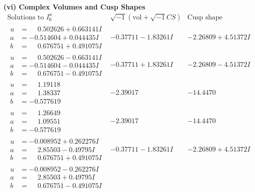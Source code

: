 \documentclass[1p]{elsarticle_modified}
\theoremstyle{definition}
\newcommand{\I}{\sqrt{-1}}
\begin{document}
\newpage\flushleft \textbf{(vi) Complex Volumes and Cusp Shapes}
$$\begin{array}{c|c|c}  
\text{Solutions to }I^u_{6}& \I (\text{vol} + \sqrt{-1}CS) & \text{Cusp shape}\\
 \hline 
\begin{aligned}
u &= \phantom{-}0.502626 + 0.663141 I \\
a &= -0.514604 + 0.044435 I \\
b &= \phantom{-}0.676751 + 0.491075 I\end{aligned}
 & -0.37711 - 1.83261 I & -2.26809 + 4.51372 I \\ \hline\begin{aligned}
u &= \phantom{-}0.502626 - 0.663141 I \\
a &= -0.514604 - 0.044435 I \\
b &= \phantom{-}0.676751 - 0.491075 I\end{aligned}
 & -0.37711 + 1.83261 I & -2.26809 - 4.51372 I \\ \hline\begin{aligned}
u &= \phantom{-}1.19118\phantom{ +0.000000I} \\
a &= \phantom{-}1.38337\phantom{ +0.000000I} \\
b &= -0.577619\phantom{ +0.000000I}\end{aligned}
 & -2.39017\phantom{ +0.000000I} & -14.4470\phantom{ +0.000000I} \\ \hline\begin{aligned}
u &= \phantom{-}1.26649\phantom{ +0.000000I} \\
a &= \phantom{-}1.09551\phantom{ +0.000000I} \\
b &= -0.577619\phantom{ +0.000000I}\end{aligned}
 & -2.39017\phantom{ +0.000000I} & -14.4470\phantom{ +0.000000I} \\ \hline\begin{aligned}
u &= -0.008952 + 0.262276 I \\
a &= \phantom{-}2.85503 - 0.49795 I \\
b &= \phantom{-}0.676751 + 0.491075 I\end{aligned}
 & -0.37711 - 1.83261 I & -2.26809 + 4.51372 I \\ \hline\begin{aligned}
u &= -0.008952 - 0.262276 I \\
a &= \phantom{-}2.85503 + 0.49795 I \\
b &= \phantom{-}0.676751 - 0.491075 I\end{aligned}

\end{array}$$
\end{document}
